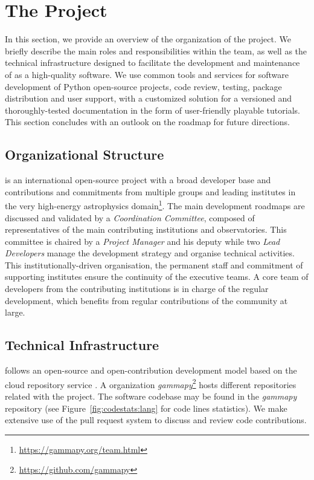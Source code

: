 \documentclass[longauth]{aa}
\begin{document}
\section{The \gammapy Project} \label{sec:gammapy-project}

In this section, we provide an overview of the organization of the \gammapy
project. We briefly describe the main roles and responsibilities within the
team, as well as the technical infrastructure designed to facilitate the
development and maintenance of \gammapy as a high-quality software. We use
common tools and services for software development of Python open-source
projects, code review, testing, package distribution and user support, with a
customized solution for a versioned and thoroughly-tested documentation in the form
of user-friendly playable tutorials. This section concludes with an outlook on
the roadmap for future directions.

\subsection{Organizational Structure}
\label{ssec:organizational-structure}

\gammapy is an international open-source project with a broad
developer base and contributions and commitments from multiple groups and
leading institutes in the very high-energy astrophysics
domain\footnote{\url{https://gammapy.org/team.html}}. The main development
roadmaps are discussed and validated by a \textit{Coordination Committee}, composed of
representatives of the main contributing institutions and observatories.
This committee is
chaired by a \textit{Project Manager} and his deputy while two \textit{Lead Developers} manage
the development strategy and organise technical activities. This
institutionally-driven organisation, the permanent staff and commitment of
supporting institutes ensure the continuity of the executive teams. A core team
of developers from the contributing institutions is in charge of the regular
development, which benefits from regular contributions of the community at
large.

\subsection{Technical Infrastructure}
\label{ssec:technical-infrastructure}

\gammapy follows an open-source and open-contribution development model based on
the cloud repository service \github. A \github organization
\textit{gammapy}\footnote{\url{https://github.com/gammapy}} hosts different
repositories related with the project. The software codebase may be found in
the \textit{gammapy} repository (see
Figure~\ref{fig:codestats:lang} for code lines statistics). We make extensive
use of the pull request system to discuss and review code contributions.
\end{document}
